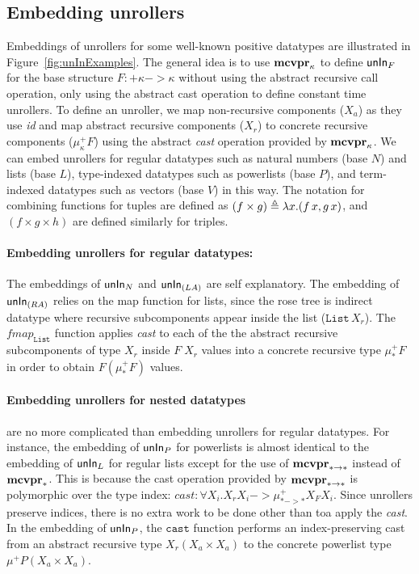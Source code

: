 \subsection{Embedding unrollers}
\label{sec:fixi:cv:unInExamples}
Embeddings of unrollers for some well-known positive datatypes
are illustrated in Figure~\ref{fig:unInExamples}. The general idea is to
use $\mathbf{mcvpr}_\kappa$ to define $\mathsf{unIn}_F$ for the base structure
$F:+\kappa -> \kappa$ without using the abstract recursive call operation,
only using the abstract cast operation to define constant time unrollers.
To define an unroller, we map non-recursive components ($X_a$) as they use
\textit{id} and map abstract recursive components ($X_r$)
to concrete recursive components ($\mu^{+}_\kappa F$) using
the abstract \textit{cast} operation provided by $\mathbf{mcvpr}_\kappa$.
We can embed unrollers for regular datatypes such as natural numbers
(base $N$) and lists (base $L$), type-indexed datatypes
such as powerlists (base $P$), and term-indexed datatypes
such as vectors (base $V$) in this way.
The notation for combining functions for tuples are defined as
$(f \times g) \triangleq \lambda x.(f\,x,g\,x)$, and $(f\times g\times h)$
are defined similarly for triples.

\paragraph{Embedding unrollers for regular datatypes:}
The embeddings of $\mathsf{unIn}_N$ and $\mathsf{unIn}_{(L A)}$ are self explanatory.
The embedding of $\mathsf{unIn}_{(R A)}$ relies on the map function for lists,
since the rose tree is indirect datatype where recursive subcomponents
appear inside the list ($\texttt{List}\,X_r$).
The $\textit{fmap}_\texttt{List}$ function applies \textit{cast} to each of
the the abstract recursive subcomponents of type $X_r$ inside $F\;X_r$
values into a concrete recursive type $\mu_{*}^{+}F$ in order to obtain
$F(\mu_{*}^{+}F)$ values.

\paragraph{Embedding unrollers for nested datatypes} are no more complicated
than embedding unrollers for regular datatypes. For instance, the embedding of
$\mathsf{unIn}_P$ for powerlists is almost identical to the embedding of $\mathsf{unIn}_L$ for
regular lists except for the use of $\mathbf{mcvpr}_{* -> *}$ instead of $\mathbf{mcvpr}_{*}$.
This is because the cast operation provided by $\mathbf{mcvpr}_{* -> *}$ is polymorphic
over the type index:
$\textit{cast}:\forall X_i. X_r X_i -> \mu^{+}_{* -> *} X_F X_i$.
Since unrollers preserve indices, there is no extra work to be done
other than toa apply the \textit{cast}. In the embedding of $\mathsf{unIn}_P$,
the $\texttt{cast}$ function performs an index-preserving cast from
an abstract recursive type $X_r (X_a\times X_a)$ to the concrete powerlist type 
$\mu^{+}P (X_a\times X_a)$.

